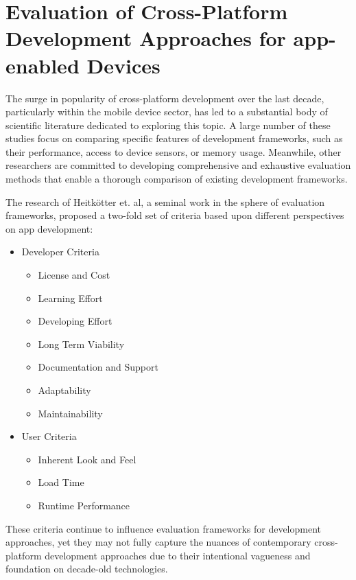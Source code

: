 \section{Evaluation of Cross-Platform Development Approaches for app-enabled Devices}
The surge in popularity of cross-platform development over the last decade, particularly within the mobile device sector, has led to a substantial body of scientific literature dedicated to exploring this topic. A large number of these studies focus on comparing specific features of development frameworks, such as their performance, access to device sensors, or memory usage. Meanwhile, other researchers are committed to developing comprehensive and exhaustive evaluation methods that enable a thorough comparison of existing development frameworks.

The research of Heitkötter et. al, a seminal work in the sphere of evaluation frameworks, proposed a two-fold set of criteria based upon different perspectives on app development:
\begin{itemize}
    \item Developer Criteria
    \begin{itemize}
        \item License and Cost
        \item Learning Effort
        \item Developing Effort
        \item Long Term Viability
        \item Documentation and Support
        \item Adaptability
        \item Maintainability
    \end{itemize}
    \item User Criteria
    \begin{itemize}
        \item Inherent Look and Feel
        \item Load Time
        \item Runtime Performance
    \end{itemize}
\end{itemize}
These criteria continue to influence evaluation frameworks for development approaches, yet they may not fully capture the nuances of contemporary cross-platform development approaches due to their intentional vagueness and foundation on decade-old technologies. 

